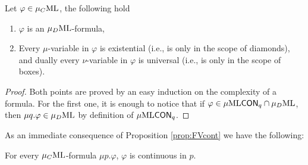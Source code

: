 \begin{proposition}
Let $\varphi \in \mu_{C}\mathrm{ML}$, the following hold
\begin{enumerate}[(1)]
\itemsep 0pt
\item $\varphi$ is an $\mu_{D}\mathrm{ML}$-formula,
\item Every $\mu$-variable in $\varphi$ is existential (i.e., is only in the scope of diamonds), and dually every $\nu$-variable in $\varphi$ is universal (i.e., is only in the scope of boxes).
\end{enumerate}
\end{proposition}
\begin{proof}
Both points are proved by an easy induction on the complexity of a formula. For the first one,  it is enough to notice that if $\varphi \in \mu\mathrm{ML}\mathsf{CON}_{q} \cap \mu_{D}\mathrm{ML}$, then $\mu q. \varphi \in \mu_{D}\mathrm{ML}$ by definition of $\mu\mathrm{ML}\mathsf{CON}_{q} $.
\end{proof}

As an immediate consequence of Proposition \ref{prop:FVcont} we have the following:

\begin{corollary}\label{cor:cont}
For every $\mu_{C}\mathrm{ML}$-formula $\mu p. \varphi$, $\varphi$ is continuous in $p$.
\end{corollary}


%
%
%
%

